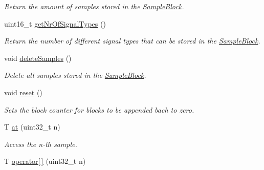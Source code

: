 \begin{DoxyCompactItemize}
\begin{DoxyCompactList}\small\item\em Return the amount of samples stored in the \hyperlink{class_sample_block}{SampleBlock}. \item\end{DoxyCompactList}\item 
\hypertarget{class_sample_block_a51555d1917386e8967244601e4e0fae1}{
uint16\_\-t \hyperlink{class_sample_block_a51555d1917386e8967244601e4e0fae1}{getNrOfSignalTypes} ()}
\label{class_sample_block_a51555d1917386e8967244601e4e0fae1}

\begin{DoxyCompactList}\small\item\em Return the number of different signal types that can be stored in the \hyperlink{class_sample_block}{SampleBlock}. \item\end{DoxyCompactList}\item 
\hypertarget{class_sample_block_a034809085d86ec523df7007e5246c9a6}{
void \hyperlink{class_sample_block_a034809085d86ec523df7007e5246c9a6}{deleteSamples} ()}
\label{class_sample_block_a034809085d86ec523df7007e5246c9a6}

\begin{DoxyCompactList}\small\item\em Delete all samples stored in the \hyperlink{class_sample_block}{SampleBlock}. \item\end{DoxyCompactList}\item 
\hypertarget{class_sample_block_a5e5ff6e8c7af6bcffa666295b944cd9a}{
void \hyperlink{class_sample_block_a5e5ff6e8c7af6bcffa666295b944cd9a}{reset} ()}
\label{class_sample_block_a5e5ff6e8c7af6bcffa666295b944cd9a}

\begin{DoxyCompactList}\small\item\em Sets the block counter for blocks to be appended bach to zero. \item\end{DoxyCompactList}\item 
T \hyperlink{class_sample_block_a7f15495c776af47b315a6b343c664fa5}{at} (uint32\_\-t n)
\begin{DoxyCompactList}\small\item\em Access the n-\/th sample. \item\end{DoxyCompactList}\item 
\hypertarget{class_sample_block_a433971bd89a7ad2426790f3262d0d75b}{
T \hyperlink{class_sample_block_a433971bd89a7ad2426790f3262d0d75b}{operator\mbox{[}$\,$\mbox{]}} (uint32\_\-t n)}
\label{class_sample_block_a433971bd89a7ad2426790f3262d0d75b}


\end{DoxyCompactItemize}
